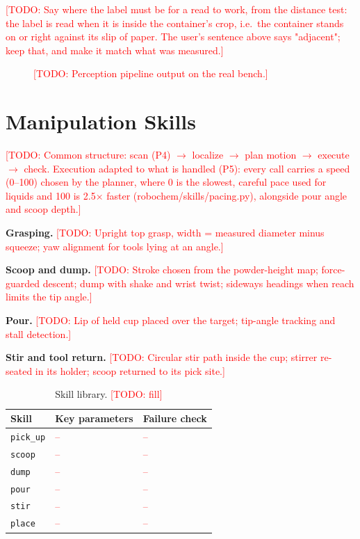 \documentclass[letterpaper, 10pt, journal, twoside]{IEEEtran}}
\newcommand{\todo}[1]{\textcolor{red}{[TODO: #1]}}
\newcommand{\tbd}{\textcolor{red}{--}}
\newcommand{\placeholderfig}[3]{%
  \fbox{\parbox[c][#2][c]{#1}{\centering\footnotesize\textcolor{gray}{#3}}}}
\begin{document}
\todo{Say where the label must be for a read to work, from the distance
test: the label is read when it is inside the container's crop, i.e.\ the
container stands on or right against its slip of paper. The user's
sentence above says "adjacent"; keep that, and make it match what was
measured.}

\begin{figure}[t]
  \centering
  \placeholderfig{0.95\columnwidth}{3.5cm}{Four camera views with masks
  and the fused point cloud}
  \caption{\todo{Perception pipeline output on the real bench.}}
  \label{fig:perception}
\end{figure}

\section{Manipulation Skills}
\label{sec:skills}

\todo{Common structure: scan (P4) $\rightarrow$ localize $\rightarrow$
plan motion $\rightarrow$ execute $\rightarrow$ check. Execution adapted
to what is handled (P5): every call carries a speed (0--100) chosen by the
planner, where 0 is the slowest, careful pace used for liquids and 100 is
2.5$\times$ faster (robochem/skills/pacing.py), alongside pour angle and
scoop depth.}

\textbf{Grasping.} \todo{Upright top grasp, width = measured diameter
minus squeeze; yaw alignment for tools lying at an angle.}

\textbf{Scoop and dump.} \todo{Stroke chosen from the powder-height map;
force-guarded descent; dump with shake and wrist twist; sideways headings
when reach limits the tip angle.}

\textbf{Pour.} \todo{Lip of held cup placed over the target; tip-angle
tracking and stall detection.}

\textbf{Stir and tool return.} \todo{Circular stir path inside the cup;
stirrer re-seated in its holder; scoop returned to its pick site.}

\begin{table}[t]
  \caption{Skill library. \todo{fill}}
  \label{tab:skills}
  \centering
  \footnotesize
  \begin{tabular}{@{}lll@{}}
    \toprule
    Skill & Key parameters & Failure check \\
    \midrule
    \texttt{pick\_up} & \tbd & \tbd \\
    \texttt{scoop}    & \tbd & \tbd \\
    \texttt{dump}     & \tbd & \tbd \\
    \texttt{pour}     & \tbd & \tbd \\
    \texttt{stir}     & \tbd & \tbd \\
    \texttt{place}    & \tbd & \tbd \\
    \bottomrule
  \end{tabular}
\end{table}
\end{document}

